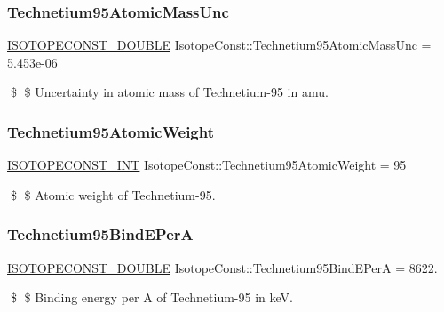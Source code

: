 \subsubsection{\texorpdfstring{Technetium95\+Atomic\+Mass\+Unc}{Technetium95AtomicMassUnc}}
{\footnotesize\ttfamily \mbox{\hyperlink{group___isotope_const-_macros_ga8f45a7272ce02c0b4c65c44636ed719a}{I\+S\+O\+T\+O\+P\+E\+C\+O\+N\+S\+T\+\_\+\+D\+O\+U\+B\+LE}} Isotope\+Const\+::\+Technetium95\+Atomic\+Mass\+Unc = 5.\+453e-\/06}

\$ \$ Uncertainty in atomic mass of Technetium-\/95 in amu. \mbox{\label{group___isotope_const-_technetium-_tc95_gae630d69dedf262891ffca1fe56d96fb0}} 
\subsubsection{\texorpdfstring{Technetium95\+Atomic\+Weight}{Technetium95AtomicWeight}}
{\footnotesize\ttfamily \mbox{\hyperlink{group___isotope_const-_macros_ga5f18360b3e99483a35c32d789e62621c}{I\+S\+O\+T\+O\+P\+E\+C\+O\+N\+S\+T\+\_\+\+I\+NT}} Isotope\+Const\+::\+Technetium95\+Atomic\+Weight = 95}

\$ \$ Atomic weight of Technetium-\/95. \mbox{\label{group___isotope_const-_technetium-_tc95_ga4508e4401bc08e2558e86940c0fe0744}} 
\subsubsection{\texorpdfstring{Technetium95\+Bind\+E\+PerA}{Technetium95BindEPerA}}
{\footnotesize\ttfamily \mbox{\hyperlink{group___isotope_const-_macros_ga8f45a7272ce02c0b4c65c44636ed719a}{I\+S\+O\+T\+O\+P\+E\+C\+O\+N\+S\+T\+\_\+\+D\+O\+U\+B\+LE}} Isotope\+Const\+::\+Technetium95\+Bind\+E\+PerA = 8622.}

\$ \$ Binding energy per A of Technetium-\/95 in keV. \mbox{\label{group___isotope_const-_technetium-_tc95_gaaab4c42a13389539a38529e7852f492e}} 
